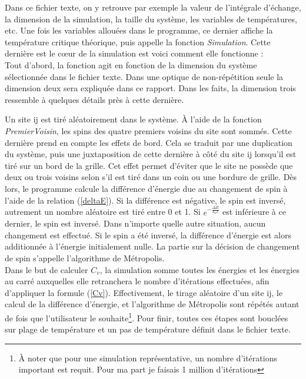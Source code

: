 \documentclass{article}
\begin{document}
Dans ce fichier texte, on y retrouve par exemple la valeur de l'intégrale d'échange, la dimension de la simulation, la taille du système, les variables de températures, etc. Une fois les variables allouées dans le programme, ce dernier affiche la température critique théorique, puis appelle la fonction \emph{Simulation}. Cette dernière est le cœur de la simulation est voici comment elle fonctionne : \\

Tout d'abord, la fonction agit en fonction de la dimension du système sélectionnée dans le fichier texte. Dans une optique de non-répétition seule la dimension deux sera expliquée dans ce rapport. Dans les faits, la dimension trois ressemble à quelques détails près à cette dernière. 

Un site ij est tiré aléatoirement dans le système. À l'aide de la fonction \emph{PremierVoisin}, les spins des quatre premiers voisins du site sont sommés. Cette dernière prend en compte les effets de bord. Cela se traduit par une duplication du système, puis une juxtaposition de cette dernière à côté du site ij lorsqu'il est tiré sur un bord de la grille. Cet effet permet d'éviter que le site ne possède que deux ou trois voisins selon s'il est tiré dans un coin ou une bordure de grille. Dès lors, le programme calcule la différence d'énergie due au changement de spin à l'aide de la relation (\ref{deltaE}). Si la différence est négative, le spin est inversé, autrement un nombre aléatoire est tiré entre 0 et 1. Si $e^{-\frac{\Delta E}{k_{b}T}}$ est inférieure à ce dernier, le spin est inversé. Dans n'importe quelle autre situation, aucun changement est effectué. Si le spin a été inversé, la différence d'énergie est alors additionnée à l'énergie initialement nulle. La partie sur la décision de changement de spin s'appelle l'algorithme de Métropolis.\\

Dans le but de calculer $C_{v}$, la simulation somme toutes les énergies et les énergies au carré auxquelles elle retranchera le nombre d'itérations effectuées, afin d'appliquer la formule (\ref{Cv}). Effectivement, le tirage aléatoire d'un site ij, le calcul de la différence d'énergie, et l'algorithme de Métropolis sont répétés autant de fois que l'utilisateur le souhaite\footnote{À noter que pour une simulation représentative, un nombre d'itérations important est requit. Pour ma part je faisais 1 million d'itérations}. Pour finir, toutes ces étapes sont bouclées sur plage de température et un pas de température définit dans le fichier texte. \\
\end{document}

